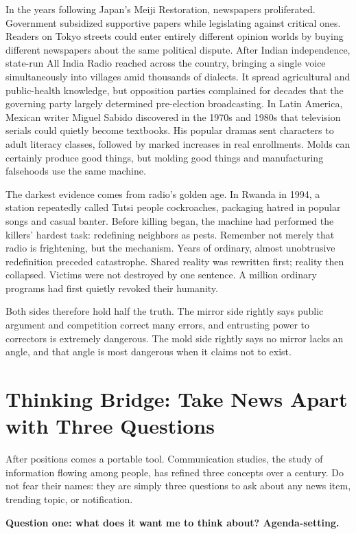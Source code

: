 In the years following Japan's Meiji Restoration, newspapers proliferated. Government subsidized supportive papers while legislating against critical ones. Readers on Tokyo streets could enter entirely different opinion worlds by buying different newspapers about the same political dispute. After Indian independence, state-run All India Radio reached across the country, bringing a single voice simultaneously into villages amid thousands of dialects. It spread agricultural and public-health knowledge, but opposition parties complained for decades that the governing party largely determined pre-election broadcasting. In Latin America, Mexican writer Miguel Sabido discovered in the 1970s and 1980s that television serials could quietly become textbooks. His popular dramas sent characters to adult literacy classes, followed by marked increases in real enrollments. Molds can certainly produce good things, but molding good things and manufacturing falsehoods use the same machine.

The darkest evidence comes from radio's golden age. In Rwanda in 1994, a station repeatedly called Tutsi people cockroaches, packaging hatred in popular songs and casual banter. Before killing began, the machine had performed the killers' hardest task: redefining neighbors as pests. Remember not merely that radio is frightening, but the mechanism. Years of ordinary, almost unobtrusive redefinition preceded catastrophe. Shared reality was rewritten first; reality then collapsed. Victims were not destroyed by one sentence. A million ordinary programs had first quietly revoked their humanity.

Both sides therefore hold half the truth. The mirror side rightly says public argument and competition correct many errors, and entrusting power to correctors is extremely dangerous. The mold side rightly says no mirror lacks an angle, and that angle is most dangerous when it claims not to exist.

\section[Three Questions about News]{Thinking Bridge: Take News Apart with Three Questions}
After positions comes a portable tool. Communication studies, the study of information flowing among people, has refined three concepts over a century. Do not fear their names: they are simply three questions to ask about any news item, trending topic, or notification.

\textbf{Question one: what does it want me to think about? Agenda-setting.}

